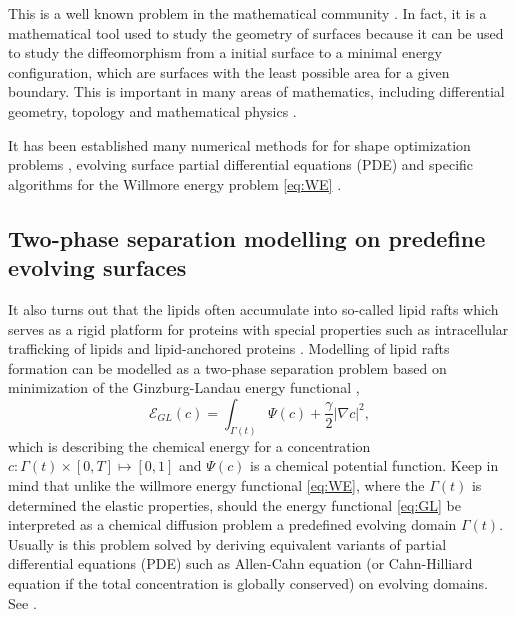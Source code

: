 This is a well known problem in the mathematical community \cite{ topping2000towards, marques2014willmore,link2013gradient,kuwert2012willmore}. In fact, it is a mathematical tool used to study the geometry of surfaces because it can be used to study
the diffeomorphism from a initial surface to a minimal energy configuration, which are surfaces with the least possible area for a given boundary. This is important in many areas of mathematics, including differential geometry, topology and mathematical physics \cite{koerber2021area,jakob2022singularities, rupp21}.

It has been established many numerical methods for for shape optimization problems \cite{sokolowski1992introduction,ito2008variational}, evolving surface partial differential equations (PDE) \cite{dziuk2013finite, dziuk2007finite,
binz2022convergent, barrett2007parametric, barrett2007variational, kovacs2019convergent, lehrenfeld2018stabilized} and specific
algorithms for the Willmore energy problem \eqref{eq:WE} \cite{palmurella2022parametric, dziuk2008computational, bonito2010parametric,  kovacs2021convergent, hu2022evolving}.

\subsection{Two-phase separation modelling on predefine evolving surfaces }%
\label{sub:two_phase_seperation_modelling_on_surfaces_}

It also turns out that the lipids often accumulate into so-called lipid rafts which serves as a rigid platform for proteins with special properties such as intracellular trafficking of lipids and lipid-anchored proteins \cite{ miller2020divide}. Modelling of
lipid rafts formation can be modelled as a two-phase separation problem based on minimization of the Ginzburg-Landau energy functional \cite{yushutin19},
\begin{equation}
\label{eq:GL}
\mathcal{E}_{GL}  \left( c   \right) = \int_{\Gamma\left(t  \right)   }^{}\Psi \left( c \right) + \frac{\gamma}{2} \left\lvert \nabla c \right\rvert^{2} ,
\end{equation}
which is describing the chemical energy for a concentration $c: \Gamma\left( t \right)  \times \left[ 0,T \right] \mapsto  \left[ 0,1 \right]  $ and $ \Psi \left( c \right)$ is a chemical potential function. Keep in mind that unlike
the willmore energy functional \eqref{eq:WE}, where the $\Gamma\left( t \right)  $ is determined the elastic properties, should the energy functional \eqref{eq:GL} be interpreted as a chemical diffusion problem a predefined evolving domain $\Gamma \left( t \right) $.
Usually is this problem solved by deriving equivalent variants of partial differential equations (PDE) such as Allen-Cahn equation (or Cahn-Hilliard equation if the total concentration is globally conserved) on evolving domains. See \cite{yushutin19, udo97, ratz16,Gera2017, caetano21}.

